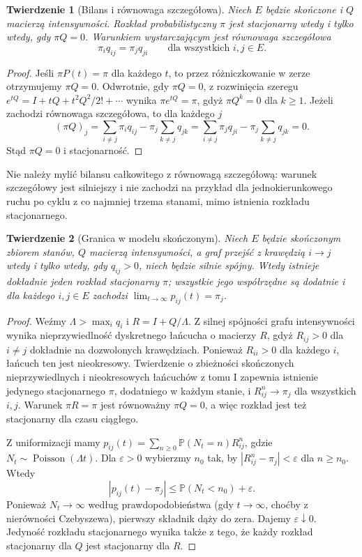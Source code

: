 \documentclass[11pt,a4paper,oneside]{report}
\numberwithin{equation}{chapter}
\theoremstyle{plain}
\newtheorem{twierdzenie}{Twierdzenie}[chapter]
\theoremstyle{definition}
\theoremstyle{remark}
\newcommand{\Prob}{\mathbb{P}}
\begin{document}
\begin{twierdzenie}[Bilans i równowaga szczegółowa]
Niech $E$ będzie skończone i $Q$ macierzą intensywności.
Rozkład probabilistyczny $\pi$ jest stacjonarny wtedy i tylko
wtedy, gdy $\pi Q=0$. Warunkiem wystarczającym jest
\emph{równowaga szczegółowa}
\[
\pi_iq_{ij}=\pi_jq_{ji}\qquad\text{dla wszystkich }i,j\in E.
\]
\end{twierdzenie}
\begin{proof}
Jeśli $\pi P(t)=\pi$ dla każdego $t$, to przez różniczkowanie
w zerze otrzymujemy $\pi Q=0$.
Odwrotnie, gdy $\pi Q=0$, z rozwinięcia szeregu
$e^{tQ}=I+tQ+t^2Q^2/2!+\cdots$ wynika
$\pi e^{tQ}=\pi$, gdyż $\pi Q^k=0$ dla $k\ge1$.
Jeżeli zachodzi równowaga szczegółowa, to dla każdego $j$
\[
(\pi Q)_j=\sum_{i\ne j}\pi_iq_{ij}-\pi_j\sum_{k\ne j}q_{jk}
=\sum_{i\ne j}\pi_jq_{ji}-\pi_j\sum_{k\ne j}q_{jk}=0.
\]
Stąd $\pi Q=0$ i stacjonarność.
\end{proof}

Nie należy mylić bilansu całkowitego z równowagą szczegółową:
warunek szczegółowy jest silniejszy i nie zachodzi na przykład
dla jednokierunkowego ruchu po cyklu z co najmniej trzema
stanami, mimo istnienia rozkładu stacjonarnego.

\begin{twierdzenie}[Granica w modelu skończonym]
Niech $E$ będzie skończonym zbiorem stanów, $Q$ macierzą
intensywności, a graf przejść z krawędzią $i\to j$ wtedy
i tylko wtedy, gdy $q_{ij}>0$, niech będzie silnie spójny.
Wtedy istnieje dokładnie jeden rozkład stacjonarny $\pi$;
wszystkie jego współrzędne są dodatnie i dla każdego
$i,j\in E$ zachodzi
$\lim_{t\to\infty}p_{ij}(t)=\pi_j$.
\end{twierdzenie}
\begin{proof}
Weźmy $\Lambda>\max_i q_i$ i $R=I+Q/\Lambda$.
Z silnej spójności grafu intensywności wynika
nieprzywiedlność dyskretnego łańcucha o macierzy $R$,
gdyż $R_{ij}>0$ dla $i\ne j$ dokładnie na dozwolonych
krawędziach. Ponieważ $R_{ii}>0$ dla każdego $i$,
łańcuch ten jest nieokresowy.
Twierdzenie o zbieżności skończonych nieprzywiedlnych
i nieokresowych łańcuchów z tomu I zapewnia istnienie
jedynego stacjonarnego $\pi$, dodatniego w każdym stanie,
i $R^n_{ij}\to\pi_j$ dla wszystkich $i,j$.
Warunek $\pi R=\pi$ jest równoważny $\pi Q=0$,
a więc rozkład jest też stacjonarny dla czasu ciągłego.

Z uniformizacji mamy
$p_{ij}(t)=\sum_{n\ge0}\Prob(N_t=n)R^n_{ij}$,
gdzie $N_t\sim\operatorname{Poisson}(\Lambda t)$.
Dla $\varepsilon>0$ wybierzmy $n_0$ tak, by
$|R^n_{ij}-\pi_j|<\varepsilon$ dla $n\ge n_0$.
Wtedy
\[
|p_{ij}(t)-\pi_j|
\le\Prob(N_t<n_0)+\varepsilon.
\]
Ponieważ $N_t\to\infty$ według prawdopodobieństwa
(gdy $t\to\infty$, choćby z nierówności Czebyszewa),
pierwszy składnik dąży do zera. Dajemy $\varepsilon\downarrow0$.
Jedyność rozkładu stacjonarnego wynika także z tego,
że każdy rozkład stacjonarny dla $Q$ jest stacjonarny dla $R$.
\end{proof}
\end{document}
